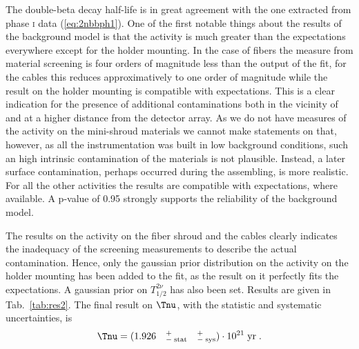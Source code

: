  The double-beta decay half-life is in great agreement with the one extracted from phase \textsc{i} data (\ref{eq:2nbbph1}). One of the first notable things about the results of the background model is that the  activity is much greater than the expectations everywhere except for the holder mounting. In the case of fibers the measure from material screening is four orders of magnitude less than the output of the fit, for the cables this reduces approximatively to one order of magnitude while the result on the holder mounting is compatible with expectations. This is a clear indication for the presence of additional  contaminations both in the vicinity of and at a higher distance from the detector array. As we do not have measures of the  activity on the mini-shroud materials we cannot make statements on that, however, as all the {\gerda} instrumentation was built in low background conditions, such an high intrinsic contamination of the materials is not plausible. Instead, a later surface contamination, perhaps occurred during the assembling, is more realistic. For all the other activities the results are compatible with expectations, where available. A p-value of 0.95 strongly supports the reliability of the background model.

 The results on the  activity on the fiber shroud and the cables clearly indicates the inadequacy of the screening measurements to describe the actual contamination. Hence, only the gaussian prior distribution on the  activity on the holder mounting has been added to the fit, as the result on it perfectly fits the expectations. A gaussian prior on $T_{1/2}^{2\nu}$ has also been set. Results are given in Tab.~\ref{tab:res2}. The final result on $\Tnu$, with the statistic and systematic uncertainties, is
\begin{equation}\Tnu=(1.926\quad^{+}_{-\;\text{stat}}\quad^{+}_{-\;\text{sys}})\cdot10^{21}\;\text{yr}\;.\end{equation}

